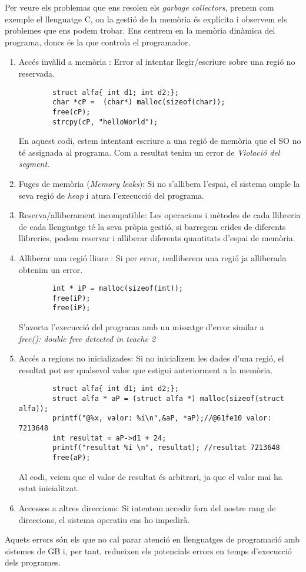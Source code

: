 
Per veure els problemas que ens resolen els \textit{garbage collectors}, prenem com exemple
el llenguatge C, on la gestió de la memòria és explícita i observem els problemes que ens podem trobar. Ens centrem en la memòria dinàmica del programa, doncs és la que controla el programador.

\begin{enumerate}
    \item Accés invàlid a memòria : Error al intentar llegir/escriure sobre una regió no reservada.

        \begin{verbatim}
        struct alfa{ int d1; int d2;};
        char *cP =  (char*) malloc(sizeof(char));
        free(cP);    
        strcpy(cP, "helloWorld");
        \end{verbatim}    
        En aquest codi, estem intentant escriure a una regió de memòria que el SO no té assignada al programa. Com a resultat tenim un error de \textit{Violació del segment}.

    \item Fuges de memòria (\textit{Memory leaks}): Si no s'allibera l'espai, el sistema omple la seva regió de \textit{heap} i atura l'execucció del programa.

    \item Reserva/alliberament incompatible: Les operacions i mètodes de cada llibreria de cada llenguatge té la seva pròpia gestió, si barregem crides de diferents llibreries, podem reservar i alliberar diferents quantitats d'espai de memòria.
    
    \item Alliberar una regió lliure : Si per error, realliberem una regió ja alliberada obtenim un error.
    \begin{verbatim}
        int * iP = malloc(sizeof(int));
        free(iP);
        free(iP);
    \end{verbatim}
    S'avorta l'execucció del programa amb un missatge d'error similar a \\ \textit{free(): double free detected in tcache 2}

    \item Accés a regions no inicializades: Si no inicializem les dades d'una regió, el resultat pot ser qualsevol valor que estigui anteriorment a la memòria.
    \begin{verbatim}
        struct alfa{ int d1; int d2;};
        struct alfa * aP = (struct alfa *) malloc(sizeof(struct alfa));
        printf("@%x, valor: %i\n",&aP, *aP);//@61fe10 valor: 7213648
        int resultat = aP->d1 + 24;
        printf("resultat %i \n", resultat); //resultat 7213648
        free(aP);
    \end{verbatim}    
    Al codi, veiem que el valor de resultat és arbitrari, ja que el valor mai ha estat inicialitzat.
    
    \item Accessos a altres direccions: Si intentem accedir fora del nostre rang de direccions, el sistema operatiu ens ho impedirà.
        
\end{enumerate}
Aquets errors són els que no cal parar atenció en llenguatges de programació amb sistemes de GB i, per tant, redueixen els potencials
errors en temps d'execucció dels programes.

